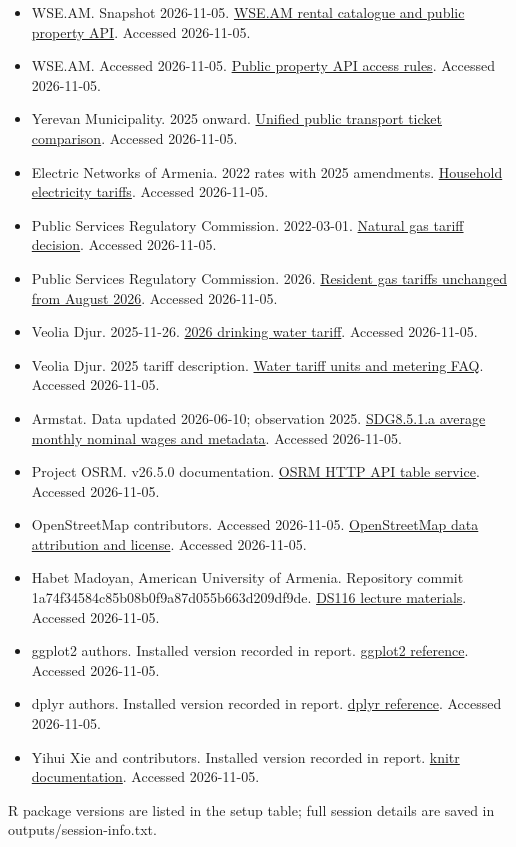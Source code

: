 \documentclass[
]{article}
\begin{document}
\begin{itemize}
\item
  WSE.AM. Snapshot 2026-11-05.
  \href{https://wse.am/en/apartments-for-rent-yerevan}{WSE.AM rental
  catalogue and public property API}. Accessed 2026-11-05.
\item
  WSE.AM. Accessed 2026-11-05. \href{https://wse.am/robots.txt}{Public
  property API access rules}. Accessed 2026-11-05.
\item
  Yerevan Municipality. 2025 onward.
  \href{https://transport.yerevan.am/}{Unified public transport ticket
  comparison}. Accessed 2026-11-05.
\item
  Electric Networks of Armenia. 2022 rates with 2025 amendments.
  \href{https://www.ena.am/Info.aspx?id=11&lang=2}{Household electricity
  tariffs}. Accessed 2026-11-05.
\item
  Public Services Regulatory Commission. 2022-03-01.
  \href{https://www.psrc.am/contents/newsPress/gas-tariff-22}{Natural
  gas tariff decision}. Accessed 2026-11-05.
\item
  Public Services Regulatory Commission. 2026.
  \href{https://psrc.am/contents/page/posts/natural-gas-tariffs-for-residents-will-stay-unchanged}{Resident
  gas tariffs unchanged from August 2026}. Accessed 2026-11-05.
\item
  Veolia Djur. 2025-11-26.
  \href{https://www.veolia.am/en/news/2026-drinking-water-tariff-consumers-will-not-increase}{2026
  drinking water tariff}. Accessed 2026-11-05.
\item
  Veolia Djur. 2025 tariff description.
  \href{https://www.veolia.am/en/consumers/frequently-asked-questions}{Water
  tariff units and metering FAQ}. Accessed 2026-11-05.
\item
  Armstat. Data updated 2026-06-10; observation 2025.
  \href{https://sdg.armstat.am/8-5-1-a-iframe/}{SDG8.5.1.a average
  monthly nominal wages and metadata}. Accessed 2026-11-05.
\item
  Project OSRM. v26.5.0 documentation.
  \href{https://project-osrm.org/docs/v26.5.0/http}{OSRM HTTP API table
  service}. Accessed 2026-11-05.
\item
  OpenStreetMap contributors. Accessed 2026-11-05.
  \href{https://www.openstreetmap.org/copyright}{OpenStreetMap data
  attribution and license}. Accessed 2026-11-05.
\item
  Habet Madoyan, American University of Armenia. Repository commit
  1a74f34584c85b08b0f9a87d055b663d209df9de.
  \href{https://github.com/ReneViva/DS116-Data-Visualization/tree/1a74f34584c85b08b0f9a87d055b663d209df9de}{DS116
  lecture materials}. Accessed 2026-11-05.
\item
  ggplot2 authors. Installed version recorded in report.
  \href{https://ggplot2.tidyverse.org/reference/}{ggplot2 reference}.
  Accessed 2026-11-05.
\item
  dplyr authors. Installed version recorded in report.
  \href{https://dplyr.tidyverse.org/reference/}{dplyr reference}.
  Accessed 2026-11-05.
\item
  Yihui Xie and contributors. Installed version recorded in report.
  \href{https://yihui.org/knitr/}{knitr documentation}. Accessed
  2026-11-05.
\end{itemize}

R package versions are listed in the setup table; full session details
are saved in outputs/session-info.txt.
\end{document}
